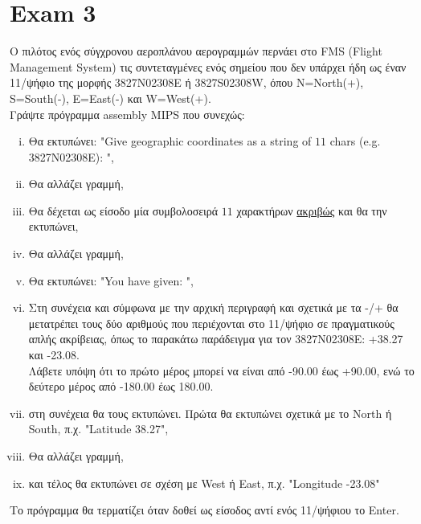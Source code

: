 \documentclass{article}
\begin{document}
\section*{Exam 3}
Ο πιλότος ενός σύγχρονου αεροπλάνου αερογραμμών περνάει στο FMS (Flight Management System)
τις συντεταγμένες ενός σημείου που δεν υπάρχει ήδη ως έναν 11/ψήφιο της μορφής 3827N02308E ή
3827S02308W, όπου N=North(+), S=South(-), E=East(-) και W=West(+).\\
Γράψτε πρόγραμμα assembly MIPS που συνεχώς:
\begin{enumerate}[i.]
    \itemsep0em
    \item Θα εκτυπώνει: "Give geographic coordinates as a string of $11$ chars (e.g. 3827N02308E): ",
    \item Θα αλλάζει γραμμή,
    \item Θα δέχεται ως είσοδο μία συμβολοσειρά $11$ χαρακτήρων \underline{ακριβώς} και θα την εκτυπώνει,
    \item Θα αλλάζει γραμμή,
    \item Θα εκτυπώνει: "You have given: ",
    \item Στη συνέχεια και σύμφωνα με την αρχική περιγραφή και σχετικά με τα -/+ θα μετατρέπει τους
    δύο αριθμούς που περιέχονται στο 11/ψήφιο σε πραγματικούς απλής ακρίβειας, όπως το
    παρακάτω παράδειγμα για τον 3827N02308E: +38.27 και -23.08.\\
    Λάβετε υπόψη ότι το πρώτο μέρος μπορεί να είναι από -90.00 έως +90.00, ενώ το δεύτερο μέρος
    από -180.00 έως 180.00.
    \item στη συνέχεια θα τους εκτυπώνει. Πρώτα θα εκτυπώνει σχετικά με το North ή South, π.χ.
    "Latitude 38.27",
    \item Θα αλλάζει γραμμή,
    \item και τέλος θα εκτυπώνει σε σχέση με West ή East, π.χ. "Longitude -23.08"
\end{enumerate}
Το πρόγραμμα θα τερματίζει όταν δοθεί ως είσοδος αντί ενός 11/ψήφιου το Enter.
\newpage
\end{document}
